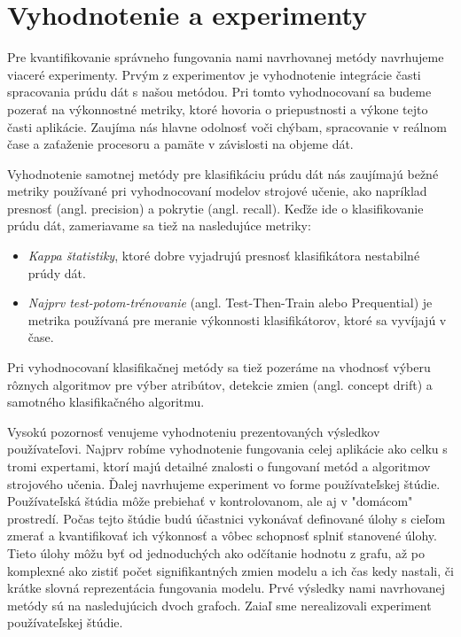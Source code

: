 \section{Vyhodnotenie a experimenty}
Pre kvantifikovanie správneho fungovania nami navrhovanej metódy navrhujeme viaceré experimenty. Prvým z experimentov je vyhodnotenie integrácie časti spracovania prúdu dát s našou metódou. Pri tomto vyhodnocovaní sa budeme pozerať na výkonnostné metriky, ktoré hovoria o priepustnosti a výkone tejto časti aplikácie. Zaujíma nás hlavne odolnosť voči chýbam, spracovanie v reálnom čase a zaťaženie procesoru a pamäte v závislosti na objeme dát.
\par
Vyhodnotenie samotnej metódy pre klasifikáciu prúdu dát nás zaujímajú bežné metriky používané pri vyhodnocovaní modelov strojové učenie, ako napríklad presnosť (angl. precision) a pokrytie (angl. recall). Keďže ide o klasifikovanie prúdu dát, zameriavame sa tiež na nasledujúce metriky:
\begin{itemize}
	\item \textit{Kappa štatistiky}, ktoré dobre vyjadrujú presnosť klasifikátora nestabilné prúdy dát.
	\item \textit{Najprv test-potom-trénovanie} (angl. Test-Then-Train alebo Prequential) je metrika používaná pre meranie výkonnosti klasifikátorov, ktoré sa vyvíjajú v čase.
\end{itemize}
Pri vyhodnocovaní klasifikačnej metódy sa tiež pozeráme na vhodnosť výberu rôznych algoritmov pre výber atribútov, detekcie zmien (angl. concept drift) a samotného klasifikačného algoritmu.
\par
Vysokú pozornosť venujeme vyhodnoteniu prezentovaných výsledkov používateľovi. Najprv robíme vyhodnotenie fungovania celej aplikácie ako celku s tromi expertami, ktorí majú detailné znalosti o fungovaní metód a algoritmov strojového učenia. Ďalej navrhujeme experiment vo forme používateľskej štúdie. Používateľská štúdia môže prebiehať v kontrolovanom, ale aj v "domácom" prostredí. Počas tejto štúdie budú účastnici vykonávať definované úlohy s cieľom zmerať a kvantifikovať ich výkonnosť a vôbec schopnosť splniť stanovené úlohy. Tieto úlohy môžu byť od jednoduchých ako odčítanie hodnotu z grafu, až po komplexné ako zistiť počet signifikantných zmien modelu a ich čas kedy nastali, či krátke slovná reprezentácia fungovania modelu. Prvé výsledky nami navrhovanej metódy sú na nasledujúcich dvoch grafoch. Zaiaľ sme nerealizovali experiment používateľskej štúdie.
\label{fig:exp-vis-concepts}
\label{fig:exp-vis-errors}

